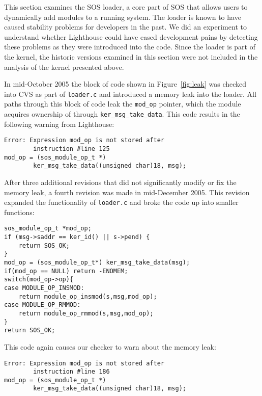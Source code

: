 This section examines the SOS loader, a core part of SOS that allows
users to dynamically add modules to a running system.  The loader is
known to have caused stability problems for developers in the past.
We did an experiment to understand whether Lighthouse 
could have eased development pains by detecting these problems as they
were introduced into the code.  Since the loader is part of the kernel, 
the historic versions examined in this section were not included in the
analysis of the kernel presented above.

In mid-October 2005 the block of code shown in Figure~\ref{fig:leak}
was checked into CVS as part of {\tt loader.c} and introduced a memory
leak into the loader.  All paths through this block of code leak the
{\tt mod\_op} pointer, which the module acquires ownership of through
{\tt ker\_msg\_take\_data}.  This code results in the following
warning from Lighthouse:

\begin{scriptsize}
\begin{verbatim}
Error: Expression mod_op is not stored after 
        instruction #line 125
mod_op = (sos_module_op_t *)
        ker_msg_take_data((unsigned char)18, msg);
\end{verbatim}
\end{scriptsize}

After three additional revisions that did not significantly modify or
fix the memory leak, a fourth revision was made in mid-December 2005.
This revision expanded the functionality of {\tt loader.c} and broke
the code up into smaller functions:

\begin{scriptsize}
\begin{verbatim}
sos_module_op_t *mod_op;
if (msg->saddr == ker_id() || s->pend) {
    return SOS_OK;
}
mod_op = (sos_module_op_t*) ker_msg_take_data(msg);
if(mod_op == NULL) return -ENOMEM;
switch(mod_op->op){
case MODULE_OP_INSMOD:
    return module_op_insmod(s,msg,mod_op);
case MODULE_OP_RMMOD:
    return module_op_rmmod(s,msg,mod_op);
}
return SOS_OK;
\end{verbatim}
\end{scriptsize}

This code again causes our checker to warn about the memory leak:

\begin{scriptsize}
\begin{verbatim}
Error: Expression mod_op is not stored after 
        instruction #line 186
mod_op = (sos_module_op_t *)
        ker_msg_take_data((unsigned char)18, msg);
\end{verbatim}
\end{scriptsize}

